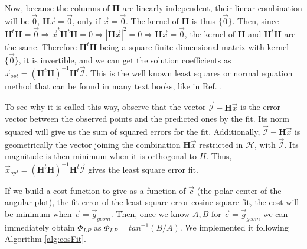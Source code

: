 \documentclass[11pt, a4paper, twoside]{article} %
\begin{document}
{Now, because the columns of $\pmb{H}$ are linearly independent, their linear combination will be $\vec{0}$, $\pmb{H}\vec{x}=\vec{0}$, only if $\vec{x}=\vec{0}$. The kernel of $\pmb{H}$ is thus $\{\vec{0}\}$. Then, since $\pmb{H}^t\pmb{H}=\vec{0}\Rightarrow \vec{x}^t\pmb{H}^t\pmb{H}=0\Rightarrow |\pmb{H}\vec{x}|^2=0\Rightarrow \pmb{H}\vec{x}=\vec{0}$, the kernel of $\pmb{H}$ and $\pmb{H}^t\pmb{H}$ are the same. Therefore $\pmb{H}^t\pmb{H}$ being a square finite dimensional matrix with kernel $\{\vec{0}\}$, it is invertible, and we can get the solution coefficients as $\vec{x}_{opt}=(\pmb{H}^t\pmb{H})^{-1}\pmb{H}^t\vec{\mathcal{I}}$. This is the well known least squares or normal equation method that can be found in many text books, like in Ref. \cite{leastsquares}.\vspace{0.1cm}

To see why it is called this way, observe that the vector $\vec{\mathcal{I}}-\pmb{H}\vec{x}$ is the error vector between the observed points and the predicted ones by the fit. Its norm squared will give us the sum of squared errors for the fit. Additionally, $\vec{\mathcal{I}}-\pmb{H}\vec{x}$ is geometrically the vector joining the combination $\pmb{H}\vec{x}$ restricted in $\mathcal{H}$, with $\vec{\mathcal{I}}$. Its magnitude is then minimum when it is orthogonal to $H$. Thus, $\vec{x}_{opt}=(\pmb{H}^t\pmb{H})^{-1}\pmb{H}^t\vec{\mathcal{I}}$ gives the least square error fit. 
}
If we build a cost function to give as a function of $\vec{c}$ (the polar center of the angular plot), the fit error of the least-square-error cosine square fit, the cost will be minimum when $\vec{c}=\vec{g}_{geom}$. Then, once we know $A,B$ for $\vec{c}=\vec{g}_{geom}$ we can immediately obtain $\Phi_{LP}$ as $\Phi_{LP}=tan^{-1}(B/A)$. We implemented it following Algorithm \ref{alg:cosFit}.
\end{document}
